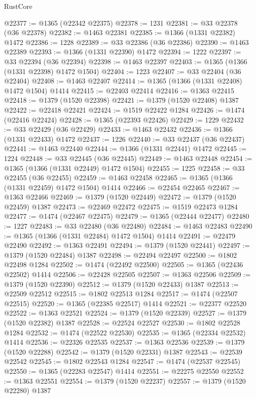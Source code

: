 \begin{lexlean}{RustCore}
\begin{coremodule}
@22377 := @1365 (@22342 @22375)
@22378 := 1231
@22381 := @33 @22378 (@36 @22378)
@22382 := @1463 @22381
@22385 := @1366 (@1331 @22382) @1472
@22386 := 1228
@22389 := @33 @22386 (@36 @22386)
@22390 := @1463 @22389
@22393 := @1366 (@1331 @22390) @1472
@22394 := 1222
@22397 := @33 @22394 (@36 @22394)
@22398 := @1463 @22397
@22403 := @1365 (@1366 (@1331 @22398) @1472 @1504)
@22404 := 1223
@22407 := @33 @22404 (@36 @22404)
@22408 := @1463 @22407
@22414 := @1365 (@1366 (@1331 @22408) @1472 @1504) @1414
@22415 := @22403 @22414
@22416 := @1363 @22415
@22418 := @1379 (@1520 @22398)
@22421 := @1379 (@1520 @22408) @1387
@22422 := @22418 @22421
@22424 := @1519 @22422 @1284
@22426 := @1474 (@22416 @22424)
@22428 := @1365 (@22393 @22426)
@22429 := 1229
@22432 := @33 @22429 (@36 @22429)
@22433 := @1463 @22432
@22436 := @1366 (@1331 @22433) @1472
@22437 := 1226
@22440 := @33 @22437 (@36 @22437)
@22441 := @1463 @22440
@22444 := @1366 (@1331 @22441) @1472
@22445 := 1224
@22448 := @33 @22445 (@36 @22445)
@22449 := @1463 @22448
@22454 := @1365 (@1366 (@1331 @22449) @1472 @1504)
@22455 := 1225
@22458 := @33 @22455 (@36 @22455)
@22459 := @1463 @22458
@22465 := @1365 (@1366 (@1331 @22459) @1472 @1504) @1414
@22466 := @22454 @22465
@22467 := @1363 @22466
@22469 := @1379 (@1520 @22449)
@22472 := @1379 (@1520 @22459) @1387
@22473 := @22469 @22472
@22475 := @1519 @22473 @1284
@22477 := @1474 (@22467 @22475)
@22479 := @1365 (@22444 @22477)
@22480 := 1227
@22483 := @33 @22480 (@36 @22480)
@22484 := @1463 @22483
@22490 := @1365 (@1366 (@1331 @22484) @1472 @1504) @1414
@22491 := @22479 @22490
@22492 := @1363 @22491
@22494 := @1379 (@1520 @22441)
@22497 := @1379 (@1520 @22484) @1387
@22498 := @22494 @22497
@22500 := @1802 @22498 @1284
@22502 := @1474 (@22492 @22500)
@22505 := @1365 (@22436 @22502) @1414
@22506 := @22428 @22505
@22507 := @1363 @22506
@22509 := @1379 (@1520 @22390)
@22512 := @1379 (@1520 @22433) @1387
@22513 := @22509 @22512
@22515 := @1802 @22513 @1284
@22517 := @1474 (@22507 @22515)
@22520 := @1365 (@22385 @22517) @1414
@22521 := @22377 @22520
@22522 := @1363 @22521
@22524 := @1379 (@1520 @22339)
@22527 := @1379 (@1520 @22382) @1387
@22528 := @22524 @22527
@22530 := @1802 @22528 @1284
@22532 := @1474 (@22522 @22530)
@22535 := @1365 (@22334 @22532) @1414
@22536 := @22326 @22535
@22537 := @1363 @22536
@22539 := @1379 (@1520 @22288)
@22542 := @1379 (@1520 @22331) @1387
@22543 := @22539 @22542
@22545 := @1802 @22543 @1284
@22547 := @1474 (@22537 @22545)
@22550 := @1365 (@22283 @22547) @1414
@22551 := @22275 @22550
@22552 := @1363 @22551
@22554 := @1379 (@1520 @22237)
@22557 := @1379 (@1520 @22280) @1387

\end{coremodule}
\end{lexlean}

